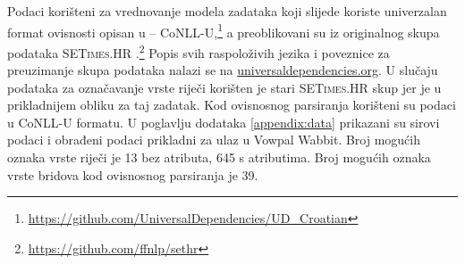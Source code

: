 Podaci korišteni za vrednovanje modela zadataka koji slijede koriste univerzalan
format ovisnosti  opisan u \citep{univdeps12} --
CoNLL-U,\footnote{\url{https://github.com/UniversalDependencies/UD_Croatian}} a
preoblikovani su iz originalnog skupa podataka \textsc{SETimes.HR}
\citep{agic2014setimes}.\footnote{\url{https://github.com/ffnlp/sethr}} Popis
svih raspoloživih jezika i poveznice za preuzimanje skupa podataka nalazi se
na \href{http://universaldependencies.org/}{universaldependencies.org}. U
slučaju podataka za označavanje vrste riječi korišten je stari
\textsc{SETimes.HR} skup jer je u prikladnijem obliku za taj zadatak. Kod
ovisnosnog parsiranja korišteni su podaci u CoNLL-U formatu. U poglavlju
dodataka \ref{appendix:data} prikazani su sirovi podaci i obrađeni podaci
prikladni za ulaz u Vowpal Wabbit. Broj mogućih oznaka vrste riječi je 13 bez
atributa, 645 s atributima. Broj mogućih oznaka vrste bridova kod ovisnosnog
parsiranja je 39.
